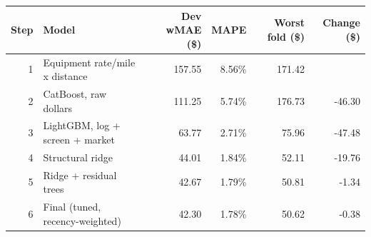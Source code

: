 \begin{tabular}{rlrrrr}
\toprule
Step & Model & Dev wMAE (\$) & MAPE & Worst fold (\$) & Change (\$) \\
\midrule
1 & Equipment rate/mile x distance & 157.55 & 8.56\% & 171.42 &  \\
2 & CatBoost, raw dollars & 111.25 & 5.74\% & 176.73 & -46.30 \\
3 & LightGBM, log + screen + market & 63.77 & 2.71\% & 75.96 & -47.48 \\
4 & Structural ridge & 44.01 & 1.84\% & 52.11 & -19.76 \\
5 & Ridge + residual trees & 42.67 & 1.79\% & 50.81 & -1.34 \\
6 & Final (tuned, recency-weighted) & 42.30 & 1.78\% & 50.62 & -0.38 \\
\bottomrule
\end{tabular}
